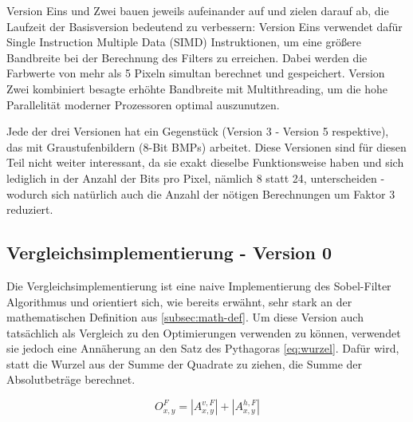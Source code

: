 \documentclass[course=erap]{aspdoc}
\begin{document}
Version Eins und Zwei bauen jeweils aufeinander auf und zielen darauf ab, die Laufzeit der Basisversion bedeutend zu verbessern:
Version Eins verwendet dafür Single Instruction Multiple Data (SIMD) Instruktionen, um eine größere Bandbreite bei der Berechnung des Filters zu erreichen.
Dabei werden die Farbwerte von mehr als 5 Pixeln simultan berechnet und gespeichert.
Version Zwei kombiniert besagte erhöhte Bandbreite mit Multithreading, um die hohe Parallelität moderner Prozessoren optimal auszunutzen.

Jede der drei Versionen hat ein Gegenstück (Version 3 - Version 5 respektive), das mit Graustufenbildern (8-Bit BMPs) arbeitet.
Diese Versionen sind für diesen Teil nicht weiter interessant, da sie exakt dieselbe Funktionsweise haben und sich lediglich in der Anzahl der Bits pro Pixel, nämlich 8 statt 24, unterscheiden - wodurch sich natürlich auch die Anzahl der nötigen Berechnungen um Faktor 3 reduziert.

\subsection{Vergleichsimplementierung - Version 0}
\label{subsec:vergleichsimplementierung}
Die Vergleichsimplementierung ist eine naive Implementierung des Sobel-Filter Algorithmus und orientiert sich, wie bereits erwähnt, sehr stark an der mathematischen Definition aus \ref{subsec:math-def}.
Um diese Version auch tatsächlich als Vergleich zu den Optimierungen verwenden zu können, verwendet sie jedoch eine Annäherung an den Satz des Pythagoras \ref{eq:wurzel}.
Dafür wird, statt die Wurzel aus der Summe der Quadrate zu ziehen, die Summe der Absolutbeträge berechnet.

\begin{equation}
    O^{F}_{x,y} = \left | A^{v,F}_{x,y} \right | + \left | A^{h,F}_{x,y} \right |
    \label{eq:betrag}
\end{equation}
\end{document}

